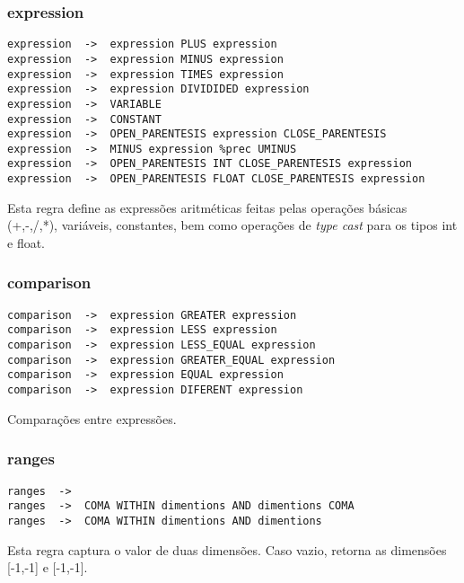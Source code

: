 \documentclass[a4paper,10pt]{article}
\begin{document}

	\subsubsection{expression}
		\begin{lstlisting}
expression	->	expression PLUS expression      
expression	->	expression MINUS expression   	     
expression	->	expression TIMES expression   	  
expression	->	expression DIVIDIDED expression	 
expression	->	VARIABLE
expression	->	CONSTANT 
expression	->	OPEN_PARENTESIS expression CLOSE_PARENTESIS
expression	->	MINUS expression %prec UMINUS
expression	->	OPEN_PARENTESIS INT CLOSE_PARENTESIS expression   	     
expression	->	OPEN_PARENTESIS FLOAT CLOSE_PARENTESIS expression  
		\end{lstlisting}
Esta regra define as express\~oes aritm\'eticas feitas pelas opera\c{c}\~oes b\'asicas (+,-,/,*), vari\'aveis, constantes, bem como opera\c{c}\~oes de \textit{type cast} para os tipos int e float.
\vspace{10mm}


	\subsubsection{comparison}
		\begin{lstlisting}
comparison	->	expression GREATER expression
comparison	->	expression LESS expression
comparison	->	expression LESS_EQUAL expression
comparison	->	expression GREATER_EQUAL expression
comparison	->	expression EQUAL expression
comparison	->	expression DIFERENT expression
		\end{lstlisting}

Compara\c{c}\~oes entre express\~oes.
\vspace{10mm}

	\subsubsection{ranges}
		\begin{lstlisting}
ranges	->	
ranges	->	COMA WITHIN dimentions AND dimentions COMA
ranges	->	COMA WITHIN dimentions AND dimentions
		\end{lstlisting}
Esta regra captura o valor de duas dimens\~oes. Caso vazio, retorna as dimens\~oes [-1,-1] e [-1,-1].
\vspace{10mm}
\end{document}
